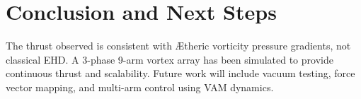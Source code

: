 \section{Conclusion and Next Steps}
The thrust observed is consistent with Ætheric vorticity pressure gradients, not classical EHD. A 3-phase 9-arm vortex array has been simulated to provide continuous thrust and scalability. Future work will include vacuum testing, force vector mapping, and multi-arm control using VAM dynamics.